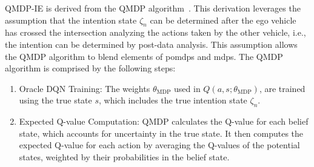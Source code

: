 QMDP-IE is derived from the QMDP algorithm~\cite{Littman1995}. 
This derivation leverages the assumption that the intention state $\zeta_n$ can be determined after the ego vehicle has crossed the intersection analyzing the actions taken by the other vehicle, i.e., the intention can be determined by post-data analysis. This assumption allows the QMDP algorithm to blend elements of \gls{pomdp}s and \gls{mdp}s.
The QMDP algorithm is comprised by the following steps:
\begin{enumerate}
	\item Oracle DQN Training: The weights $\theta_\mathrm{MDP}$ used in $Q(a,s;\theta_\mathrm{MDP})$, are trained using the true state $s$, which includes the true intention state $\zeta_n$. %
	\item Expected Q-value Computation: QMDP calculates the Q-value for each belief state, which accounts for uncertainty in the true state. It then computes the expected Q-value for each action by averaging the Q-values of the potential states, weighted by their probabilities in the belief state.

\end{enumerate}

